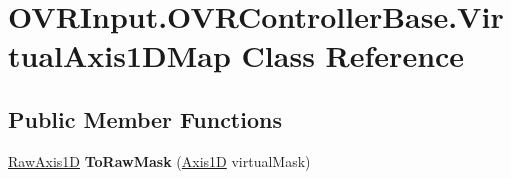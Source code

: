 \hypertarget{class_o_v_r_input_1_1_o_v_r_controller_base_1_1_virtual_axis1_d_map}{}\section{O\+V\+R\+Input.\+O\+V\+R\+Controller\+Base.\+Virtual\+Axis1\+D\+Map Class Reference}
\label{class_o_v_r_input_1_1_o_v_r_controller_base_1_1_virtual_axis1_d_map}
\subsection*{Public Member Functions}
\begin{DoxyCompactItemize}
\item 
\mbox{\label{class_o_v_r_input_1_1_o_v_r_controller_base_1_1_virtual_axis1_d_map_a49158b0537ddb018c5c0779d16f85bfa}} 
\mbox{\hyperlink{class_o_v_r_input_a9c9eff2910ca07d1fb0e924273ebefaf}{Raw\+Axis1D}} {\bfseries To\+Raw\+Mask} (\mbox{\hyperlink{class_o_v_r_input_af5c3e63489ca9ee2e5db3a657f7f27f6}{Axis1D}} virtual\+Mask)
\end{DoxyCompactItemize}
